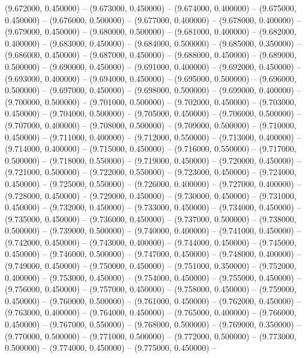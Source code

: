 (9.672000, 0.450000) -- 
(9.673000, 0.450000) -- 
(9.674000, 0.400000) -- 
(9.675000, 0.450000) -- 
(9.676000, 0.500000) -- 
(9.677000, 0.400000) -- 
(9.678000, 0.400000) -- 
(9.679000, 0.450000) -- 
(9.680000, 0.500000) -- 
(9.681000, 0.400000) -- 
(9.682000, 0.400000) -- 
(9.683000, 0.450000) -- 
(9.684000, 0.500000) -- 
(9.685000, 0.350000) -- 
(9.686000, 0.450000) -- 
(9.687000, 0.450000) -- 
(9.688000, 0.450000) -- 
(9.689000, 0.500000) -- 
(9.690000, 0.450000) -- 
(9.691000, 0.400000) -- 
(9.692000, 0.450000) -- 
(9.693000, 0.400000) -- 
(9.694000, 0.450000) -- 
(9.695000, 0.500000) -- 
(9.696000, 0.500000) -- 
(9.697000, 0.450000) -- 
(9.698000, 0.500000) -- 
(9.699000, 0.400000) -- 
(9.700000, 0.500000) -- 
(9.701000, 0.500000) -- 
(9.702000, 0.450000) -- 
(9.703000, 0.450000) -- 
(9.704000, 0.500000) -- 
(9.705000, 0.450000) -- 
(9.706000, 0.500000) -- 
(9.707000, 0.400000) -- 
(9.708000, 0.500000) -- 
(9.709000, 0.500000) -- 
(9.710000, 0.450000) -- 
(9.711000, 0.400000) -- 
(9.712000, 0.550000) -- 
(9.713000, 0.400000) -- 
(9.714000, 0.400000) -- 
(9.715000, 0.450000) -- 
(9.716000, 0.550000) -- 
(9.717000, 0.500000) -- 
(9.718000, 0.550000) -- 
(9.719000, 0.450000) -- 
(9.720000, 0.450000) -- 
(9.721000, 0.500000) -- 
(9.722000, 0.550000) -- 
(9.723000, 0.450000) -- 
(9.724000, 0.450000) -- 
(9.725000, 0.550000) -- 
(9.726000, 0.400000) -- 
(9.727000, 0.400000) -- 
(9.728000, 0.450000) -- 
(9.729000, 0.450000) -- 
(9.730000, 0.450000) -- 
(9.731000, 0.450000) -- 
(9.732000, 0.450000) -- 
(9.733000, 0.450000) -- 
(9.734000, 0.450000) -- 
(9.735000, 0.450000) -- 
(9.736000, 0.450000) -- 
(9.737000, 0.500000) -- 
(9.738000, 0.500000) -- 
(9.739000, 0.500000) -- 
(9.740000, 0.400000) -- 
(9.741000, 0.450000) -- 
(9.742000, 0.450000) -- 
(9.743000, 0.400000) -- 
(9.744000, 0.450000) -- 
(9.745000, 0.450000) -- 
(9.746000, 0.500000) -- 
(9.747000, 0.450000) -- 
(9.748000, 0.400000) -- 
(9.749000, 0.450000) -- 
(9.750000, 0.450000) -- 
(9.751000, 0.350000) -- 
(9.752000, 0.400000) -- 
(9.753000, 0.450000) -- 
(9.754000, 0.450000) -- 
(9.755000, 0.450000) -- 
(9.756000, 0.450000) -- 
(9.757000, 0.450000) -- 
(9.758000, 0.450000) -- 
(9.759000, 0.450000) -- 
(9.760000, 0.500000) -- 
(9.761000, 0.450000) -- 
(9.762000, 0.450000) -- 
(9.763000, 0.400000) -- 
(9.764000, 0.450000) -- 
(9.765000, 0.400000) -- 
(9.766000, 0.450000) -- 
(9.767000, 0.550000) -- 
(9.768000, 0.500000) -- 
(9.769000, 0.350000) -- 
(9.770000, 0.500000) -- 
(9.771000, 0.500000) -- 
(9.772000, 0.500000) -- 
(9.773000, 0.500000) -- 
(9.774000, 0.450000) -- 
(9.775000, 0.450000) -- 

